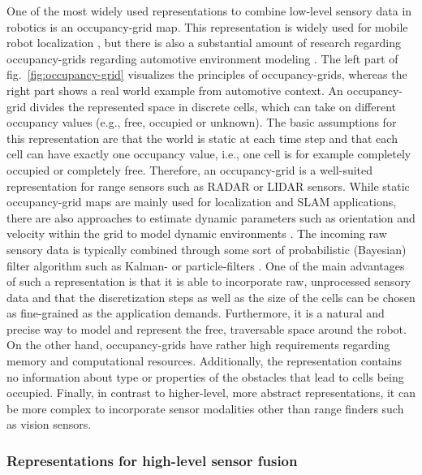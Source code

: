 One of the most widely used representations to combine low-level sensory data in robotics is an occupancy-grid map.
This representation is widely used for mobile robot localization \cite{Thrun2005}, but there is also a substantial amount of research regarding occupancy-grids regarding automotive environment modeling  \cite{Tanzmeister2014, Steyer2018}.
The left part of fig.~\ref{fig:occupancy-grid} visualizes the principles of occupancy-grids, whereas the right part shows a real world example from automotive context.
An occupancy-grid divides the represented space in discrete cells, which can take on different occupancy values (e.g., free, occupied or unknown).
The basic assumptions for this representation are that the world is static at each time step and that each cell can have exactly one occupancy value, i.e., one cell is for example completely occupied or completely free.
Therefore, an occupancy-grid is a well-suited representation for range sensors such as \ac{RADAR} or \ac{LIDAR} sensors.
While static occupancy-grid maps are mainly used for localization and \ac{SLAM} applications, there are also approaches to estimate dynamic parameters such as orientation and velocity within the grid to model dynamic environments \cite{Tanzmeister2014}.
The incoming raw sensory data is typically combined through some sort of probabilistic (Bayesian) filter algorithm such as Kalman- \cite{Kalman1960} or particle-filters \cite{Gordon1993}.
One of the main advantages of such a representation is that it is able to incorporate raw, unprocessed sensory data and that the discretization steps as well as the size of the cells can be chosen as fine-grained as the application demands.
Furthermore, it is a natural and precise way to model and represent the free, traversable space around the robot.
On the other hand, occupancy-grids have rather high requirements regarding memory and computational resources.
Additionally, the representation contains no information about type or properties of the obstacles that lead to cells being occupied.
Finally, in contrast to higher-level, more abstract representations, it can be more complex to incorporate sensor modalities other than range finders such as vision sensors.

\subsubsection{Representations for high-level sensor fusion}

